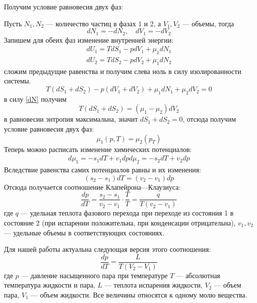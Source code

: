 \documentclass[a4paper,12pt]{report}
\begin{document}
    \begin{multicols}{2}

    Получим условие равновесия двух фаз:

    Пусть $N_1, N_2$ --- количество частиц в фазах 1 и 2, а $V_1, V_2$ --- объемы, тогда
    \begin{equation}
        \label{dN}
        dN_1=-dN_2, \quad dV_1=-dV_2
    \end{equation}
    Запишем для обеих фаз изменение внутренней энергии:
    \begin{gather*}
        dU_1=TdS_1-pdV_1+\mu_1 dN_1 \\
        dU_2=TdS_2-pdV_2+\mu_1 dN_2
    \end{gather*}
    сложим предыдущие равенства и получим слева ноль в силу изолированности системы.
    \begin{equation*}
        T(dS_1+dS_2)-p(dV_1+dV_2)+\mu_1 dN_1 + \mu_2 dV_2 = 0
    \end{equation*}
    в силу \eqref{dN} получим
    \begin{equation*}
        T(dS_1+dS_2)=(\mu_1-\mu_2)dV_2
    \end{equation*}
    в равновесии энтропия максимальна, значит $dS_1+dS_2=0$, отсюда получим условие равновесия двух фаз:
    \begin{equation}
        \label{condition}
        \mu_1(p,T)=\mu_2(p_T)
    \end{equation}
    Теперь можно расписать изменение химических потенциалов:
    \begin{gather*}
        d\mu_1=-s_1dT+v_1dp
        d\mu_2=-s_2dT+v_2dp
    \end{gather*}
    Вследствие равенства самих потенциалов равны и их изменения:
    \begin{equation*}
        (s_2-s_1)dT=(v_2-v_1)dp
    \end{equation*}
    Отсюда получается соотношение Клапейрона---Клаузиуса:
    \begin{equation}
        \frac{dp}{dT}=\frac{s_2-s_1}{v_2-v_1}\cdot\frac{T}{T}=\frac{q}{T(v_2-v_1)}
    \end{equation}
    где $q$ --- удельная теплота фазового перехода при переходе из состояния 1 в состояние 2 (при испарении положительна, при конденсации отрицательна), $v_1, v_2$ --- удельные объемы в соответствующих состояниях.

    Для нашей работы актуальна следующая версия этого соотношения:
    \begin{equation}
        \label{clausius}
        \frac{dp}{dT}=\frac{L}{T(V_2-V_1)}
    \end{equation}
    где $p$ --- давление насыщенного пара при температуре $T$ --- абсолютная температура жидкости и пара, $L$ --- теплота испарения жидкости, $V_2$ --- объем пара, $V_1$ --- объем жидкости. Все величины относятся к одному молю вещества.


\end{multicols}
\end{document}
